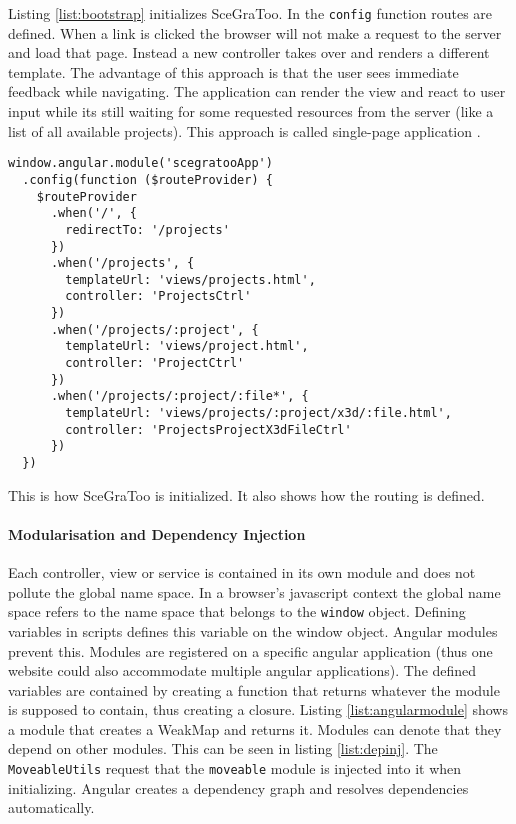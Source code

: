 Listing \ref{list:bootstrap} initializes SceGraToo. In the \texttt{config}
function routes are defined. When a link is clicked the browser will not make a
request to the server and load that page. Instead a new controller takes over and
renders a different template. The advantage of this approach is that the user
sees immediate feedback while navigating. The application can render the view and
react to user input while its still waiting for some requested resources from
the server (like a list of all available projects). This approach is called
single-page application \cite{Mikowski:2013:SPW:2663433}.

\begin{listing}
  \begin{verbatim}
window.angular.module('scegratooApp')
  .config(function ($routeProvider) {
    $routeProvider
      .when('/', {
        redirectTo: '/projects'
      })
      .when('/projects', {
        templateUrl: 'views/projects.html',
        controller: 'ProjectsCtrl'
      })
      .when('/projects/:project', {
        templateUrl: 'views/project.html',
        controller: 'ProjectCtrl'
      })
      .when('/projects/:project/:file*', {
        templateUrl: 'views/projects/:project/x3d/:file.html',
        controller: 'ProjectsProjectX3dFileCtrl'
      })
  })
  \end{verbatim}
  \caption{This is how \gls{SceGraToo} is initialized. It also shows how the routing is defined.}
  \label{list:bootstrap}
\end{listing}

\paragraph{Modularisation and Dependency Injection}
\label{par:modularisation}

Each controller, view or service is contained in its own module and does not
pollute the global name space. In a browser's javascript context the global
name space refers to the name space that belongs to the \texttt{window} object.
Defining variables in scripts defines this variable on the window object.
Angular modules prevent this. Modules are registered on a specific angular
application (thus one website could also accommodate multiple angular
applications). The defined variables are contained by creating a function that
returns whatever the module is supposed to contain, thus creating a closure.
Listing \ref{list:angularmodule} shows a module that creates a WeakMap and
returns it. Modules can denote that they depend on other modules. This can be
seen in listing \ref{list:depinj}. The \texttt{MoveableUtils} request that the
\texttt{moveable} module is injected into it when initializing. Angular creates
a dependency graph and resolves dependencies automatically.


